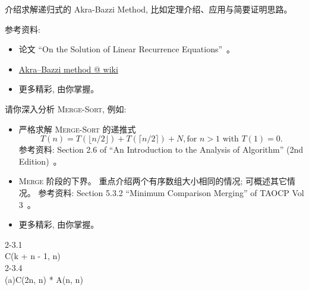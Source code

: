\documentclass[a4paper, justified]{tufte-handout}
\begin{document}
\begin{solution}
\end{solution}

\beginot

\begin{ot}
  介绍求解递归式的 Akra-Bazzi Method, 比如定理介绍、应用与简要证明思路。

  \noindent 参考资料:
  \begin{itemize}
    \item 论文 ``On the Solution of Linear Recurrence Equations''~\cite{ABMethod}。
    \item \href{https://en.wikipedia.org/wiki/Akra\%E2\%80\%93Bazzi\_method}{Akra–Bazzi method @ wiki}
    \item 更多精彩, 由你掌握。
  \end{itemize}
\end{ot}

\vspace{0.50cm}
\begin{ot}
  请你深入分析 \textsc{Merge-Sort}, 例如:
  \begin{itemize}
    \item 严格求解 \textsc{Merge-Sort} 的递推式
          \[
            T(n) = T(\lfloor n/2 \rfloor) + T(\lceil n/2 \rceil) + N, \text{for } n > 1 \text{ with } T(1) = 0.
          \]
          参考资料: Section 2.6 of ``An Introduction to the Analysis of Algorithm'' (2nd Edition)~\cite{AoA}。
    \item \textsc{Merge} 阶段的下界。
          重点介绍两个有序数组大小相同的情况; 可概述其它情况。
          参考资料: Section 5.3.2 ``Minimum Comparison Merging'' of TAOCP Vol 3~\cite{TAOCP-Vol3}。
    \item 更多精彩, 由你掌握。
  \end{itemize}
\end{ot}




2-3.1\\
C(k + n - 1, n)\\
2-3.4\\
(a)C(2n, n) * A(n, n)\\
\end{document}

